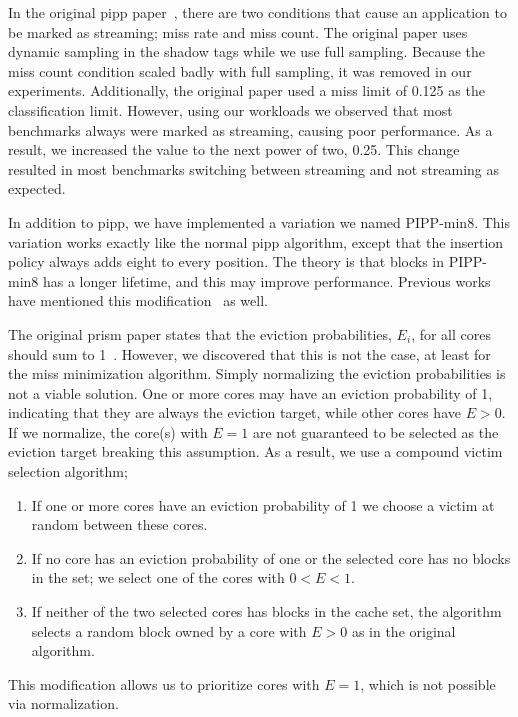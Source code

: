 In the original \gls{pipp} paper~\cite{Xie2009}, there are two conditions that cause an application to be marked as streaming; miss rate and miss count.
The original paper uses dynamic sampling in the shadow tags while we use full sampling.
Because the miss count condition scaled badly with full sampling, it was removed in our experiments.
Additionally, the original paper used a miss limit of 0.125 as the classification limit.
However, using our workloads we observed that most benchmarks always were marked as streaming, causing poor performance.
As a result, we increased the value to the next power of two, 0.25.
This change resulted in most benchmarks switching between streaming and not streaming as expected.

In addition to \gls{pipp}, we have implemented a variation we named PIPP-min8.
This variation works exactly like the normal \gls{pipp} algorithm, except that the insertion policy always adds eight to every position.
The theory is that blocks in PIPP-min8 has a longer lifetime, and this may improve performance.
Previous works have mentioned this modification~\cite{Manikantan2012} as well.

The original \gls{prism} paper states that the eviction probabilities, $E_i$, for all cores should sum to 1~\cite{Manikantan2012}.
However, we discovered that this is not the case, at least for the miss minimization algorithm.
Simply normalizing the eviction probabilities is not a viable solution.
One or more cores may have an eviction probability of 1, indicating that they are always the eviction target, while other cores have $E > 0$.
If we normalize, the core(s) with $E=1$ are not guaranteed to be selected as the eviction target breaking this assumption.
As a result, we use a compound victim selection algorithm;
\begin{enumerate}
\item If one or more cores have an eviction probability of 1 we choose a victim at random between these cores.
\item If no core has an eviction probability of one or the selected core has no blocks in the set; we select one of the cores with $0 < E < 1$.
\item If neither of the two selected cores has blocks in the cache set, the algorithm selects a random block owned by a core with $E > 0$ as in the original algorithm.
\end{enumerate}
This modification allows us to prioritize cores with $E = 1$, which is not possible via normalization.
